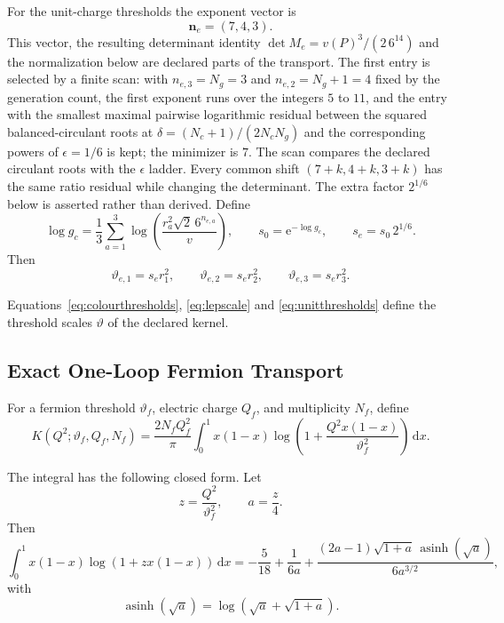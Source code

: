 \documentclass[11pt]{article}
\theoremstyle{remark}
\newcommand{\dd}{\,\mathrm d}
\newcommand{\e}{\mathrm e}
\begin{document}
For the unit-charge thresholds the exponent vector is
\begin{equation}
\bm n_e=(7,4,3).
\label{eq:lepexp}
\end{equation}
This vector, the resulting determinant identity
\(\det M_e=v(P)^3/(2\,6^{14})\) and the normalization below are declared
parts of the transport. The first entry is selected by a
finite scan: with \(n_{e,3}=N_g=3\) and \(n_{e,2}=N_g+1=4\) fixed by the
generation count, the first exponent runs over the integers \(5\) to
\(11\), and the entry with the smallest maximal pairwise logarithmic residual
between the squared balanced-circulant roots at
\(\delta=(N_c+1)/(2N_cN_g)\) and the corresponding powers of \(\epsilon=1/6\)
is kept; the minimizer is \(7\). The scan compares the declared circulant
roots with the \(\epsilon\) ladder. Every common shift
\((7+k,4+k,3+k)\) has the same
ratio residual while changing the determinant.  The extra factor \(2^{1/6}\)
below is asserted rather than derived.
Define
\begin{equation}
\log g_c
=
\frac{1}{3}
\sum_{a=1}^3
\log\!\left(
\frac{r_a^2\sqrt2\,6^{n_{e,a}}}{v}
\right),
\qquad
s_0=\e^{-\log g_c},
\qquad
s_e=s_0\,2^{1/6}.
\label{eq:lepscale}
\end{equation}
Then
\begin{equation}
\vartheta_{e,1}=s_e r_1^2,
\qquad
\vartheta_{e,2}=s_e r_2^2,
\qquad
\vartheta_{e,3}=s_e r_3^2.
\label{eq:unitthresholds}
\end{equation}

Equations~\eqref{eq:colourthresholds}, \eqref{eq:lepscale} and
\eqref{eq:unitthresholds} define the threshold scales \(\vartheta\) of the
declared kernel.


\subsection{Exact One-Loop Fermion Transport}
\label{sec:alpha-step-14}

For a fermion threshold \(\vartheta_f\), electric charge \(Q_f\), and multiplicity \(N_f\), define
\begin{equation}
K(Q^2;\vartheta_f,Q_f,N_f)
=
\frac{2N_fQ_f^2}{\pi}
\int_0^1 x(1-x)
\log\!\left(1+\frac{Q^2x(1-x)}{\vartheta_f^2}\right)\dd x.
\label{eq:kernelint}
\end{equation}

The integral has the following closed form. Let
\begin{equation}
z=\frac{Q^2}{\vartheta_f^2},
\qquad
a=\frac{z}{4}.
\end{equation}
Then
\begin{equation}
\int_0^1 x(1-x)\log(1+zx(1-x))\dd x
=
-\frac{5}{18}
+\frac{1}{6a}
+\frac{(2a-1)\sqrt{1+a}\,\operatorname{asinh}(\sqrt a)}
{6a^{3/2}},
\label{eq:kernelclosed}
\end{equation}
with
\begin{equation}
\operatorname{asinh}(\sqrt a)
=
\log(\sqrt a+\sqrt{1+a}).
\end{equation}
\end{document}
